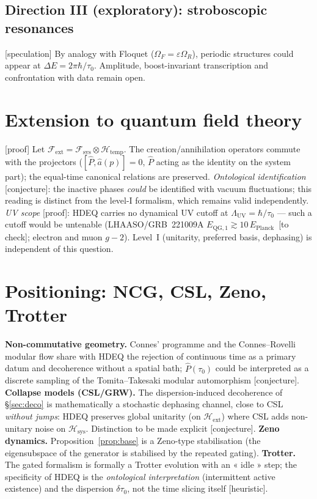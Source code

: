 \documentclass[11pt,a4paper]{article}
\newcommand{\Hext}{\mathcal{H}_{\mathrm{ext}}}
\newcommand{\Hsys}{\mathcal{H}_{\mathrm{sys}}}
\newcommand{\Htemp}{\mathcal{H}_{\mathrm{temp}}}
\newcommand{\statut}[1]{{\footnotesize\textsf{[#1]}}}
\theoremstyle{plain}
\theoremstyle{definition}
\theoremstyle{remark}
\begin{document}
\subsection{Direction III (exploratory): stroboscopic resonances}
\statut{speculation} By analogy with Floquet ($\Omega_F=\varepsilon\Omega_R$),
periodic structures could appear at $\Delta E=2\pi\hbar/\tau_0$. Amplitude,
boost-invariant transcription and confrontation with data remain open.

\section{Extension to quantum field theory}
\statut{proof} Let $\mathcal{F}_{\mathrm{ext}}=\mathcal{F}_{\mathrm{sys}}\otimes\Htemp$.
The creation/annihilation operators commute with the projectors
($[\hat P,\hat a(p)]=0$, $\hat P$ acting as the identity on the system part);
the equal-time canonical relations are preserved.
\emph{Ontological identification} \statut{conjecture}: the inactive phases
\emph{could} be identified with vacuum fluctuations; this reading is distinct
from the level-I formalism, which remains valid independently.
\emph{UV scope} \statut{proof}: HDEQ carries no dynamical UV cutoff at
$\Lambda_{\mathrm{UV}}=\hbar/\tau_0$ --- such a cutoff would be untenable
(LHAASO/GRB~221009A $E_{\mathrm{QG},1}\gtrsim10\,E_{\mathrm{Planck}}$~\statut{to check};
electron and muon $g-2$). Level~I (unitarity, preferred basis, dephasing) is
independent of this question.

\section{Positioning: NCG, CSL, Zeno, Trotter}\label{sec:pos}
\textbf{Non-commutative geometry.} Connes' programme and the Connes--Rovelli
modular flow share with HDEQ the rejection of continuous time as a primary datum
and decoherence without a spatial bath; $\hat P(\tau_0)$ could be interpreted as
a discrete sampling of the Tomita--Takesaki modular automorphism \statut{conjecture}.
\textbf{Collapse models (CSL/GRW).} The dispersion-induced decoherence of
\S\ref{sec:deco} is mathematically a stochastic dephasing channel, close to CSL
\emph{without jumps}: HDEQ preserves global unitarity (on $\Hext$) where CSL adds
non-unitary noise on $\Hsys$. Distinction to be made explicit \statut{conjecture}.
\textbf{Zeno dynamics.} Proposition~\ref{prop:base} is a Zeno-type stabilisation
(the eigensubspace of the generator is stabilised by the repeated gating).
\textbf{Trotter.} The gated formalism is formally a Trotter evolution with an
« idle » step; the specificity of HDEQ is the \emph{ontological interpretation}
(intermittent active existence) and the dispersion $\delta\tau_0$, not the time
slicing itself \statut{heuristic}.
\end{document}
